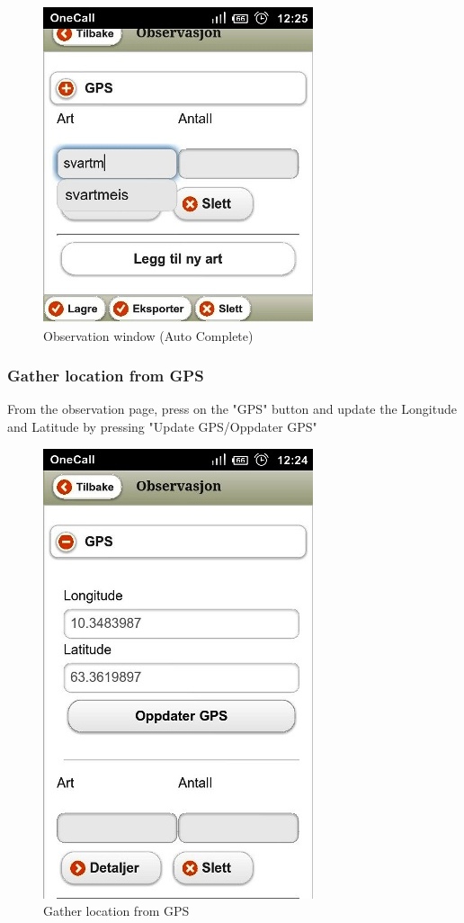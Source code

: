 \begin{figure}[h!]
\centering

 \includegraphics[scale=0.7]{appendix/pic/auto.jpg}

 \caption{Observation window (Auto Complete)}
 \end{figure}



\pagebreak
\subsubsection{Gather location from GPS}
From the observation page, press on the "GPS" button and update the Longitude and Latitude by pressing "Update GPS/Oppdater GPS"

\begin{figure}[h!]
\centering

 \includegraphics[scale=0.7]{appendix/pic/gps.jpg}

 \caption{Gather location from GPS}
 \end{figure}

